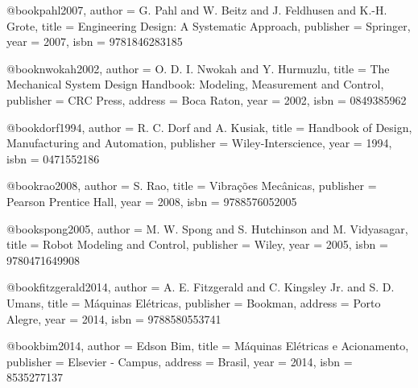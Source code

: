 @book{pahl2007,
  author = {G. Pahl and W. Beitz and J. Feldhusen and K.-H. Grote},
  title = {Engineering Design: A Systematic Approach},
  publisher = {Springer},
  year = {2007},
  isbn = {9781846283185}
}

@book{nwokah2002,
  author = {O. D. I. Nwokah and Y. Hurmuzlu},
  title = {The Mechanical System Design Handbook: Modeling, Measurement and Control},
  publisher = {CRC Press},
  address = {Boca Raton},
  year = {2002},
  isbn = {0849385962}
}

@book{dorf1994,
  author = {R. C. Dorf and A. Kusiak},
  title = {Handbook of Design, Manufacturing and Automation},
  publisher = {Wiley-Interscience},
  year = {1994},
  isbn = {0471552186}
}

@book{rao2008,
  author = {S. Rao},
  title = {Vibrações Mecânicas},
  publisher = {Pearson Prentice Hall},
  year = {2008},
  isbn = {9788576052005}
}

@book{spong2005,
  author = {M. W. Spong and S. Hutchinson and M. Vidyasagar},
  title = {Robot Modeling and Control},
  publisher = {Wiley},
  year = {2005},
  isbn = {9780471649908}
}

%

@book{fitzgerald2014,
  author = {A. E. Fitzgerald and C. Kingsley Jr. and S. D. Umans},
  title = {Máquinas Elétricas},
  publisher = {Bookman},
  address = {Porto Alegre},
  year = {2014},
  isbn = {9788580553741}
}

@book{bim2014,
  author = {Edson Bim},
  title = {Máquinas Elétricas e Acionamento},
  publisher = {Elsevier - Campus},
  address = {Brasil},
  year = {2014},
  isbn = {8535277137}
}

